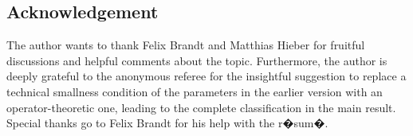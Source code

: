 \documentclass[preprint]{elsarticle}
\numberwithin{equation}{section}
\begin{document}

\subsection*{Acknowledgement}

The author wants to thank Felix Brandt and Matthias Hieber for fruitful discussions and helpful comments about the topic. Furthermore, the author is deeply grateful to the anonymous referee for the insightful suggestion to replace a technical smallness condition of the parameters in the earlier version with an operator-theoretic one, leading to the complete classification in the main result. Special thanks go to Felix Brandt for his help with the r�sum�. 
\end{document}
